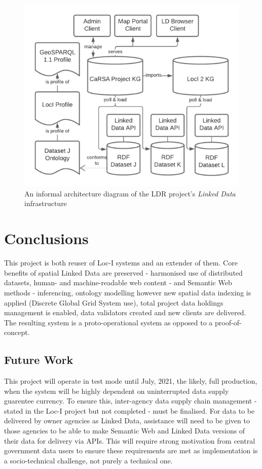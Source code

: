 \documentclass[runningheads]{llncs}
\begin{document}
\begin{figure}[htb]
    \centering
    \includegraphics[width=0.8\linewidth]{images/l4dr-arch.png}
    \caption{An informal architecture diagram of the LDR project's \textit{Linked Data} infrastructure}
    \label{fig:l4dr-arch}
\end{figure}


\section{Conclusions}\label{sec:conclusions}
This project is both reuser of Loc-I systems and an extender of them. Core benefits of spatial Linked Data are preserved - harmonised use of distributed datasets, human- and machine-readable 
web content - and Semantic Web methods - inferencing, ontology modelling however new spatial data indexing is applied (Discrete Global Grid System use), total project data holdings management is
enabled, data validators created and new clients are delivered. The resulting system is a proto-operational system as opposed to a proof-of-concept.


\subsection{Future Work}\label{sec:futurework}
This project will operate in test mode until July, 2021, the likely, full production, when the system will be highly dependent on 
uninterrupted data supply guarentee currency. To ensure this, inter-agency data supply chain management - stated in the Loc-I project but not completed - 
must be finalised. For data to be delivered by owner agencies as Linked Data, assistance will need to be given to those agencies to be able to make Semantic Web and Linked Data versions of their data
for delivery via APIs. This will require strong motivation from central government data users to ensure these requirements are met as implementation is a socio-technical challenge, not purely a 
technical one.
\end{document}
